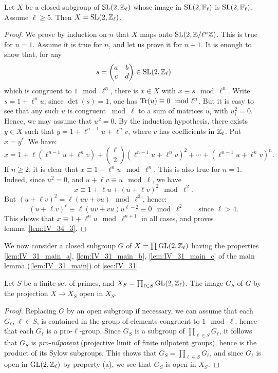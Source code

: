 \begin{lem}\label{lem:IV_34_3}
	Let $X$ be a closed subgroup of $\operatorname{SL}(2, \mathbb{Z}_\ell)$ whose image
	in $\operatorname{SL}(2, \mathbb{F}_\ell)$ is $\operatorname{SL}(2, \mathbb{F}_\ell)$. Assume $\ell \ge 5$. Then $X
	= \operatorname{SL}(2, \mathbb{Z}_\ell)$.
\end{lem}
\begin{proof}
	We prove by induction on $n$ that $X$ maps onto $\operatorname{SL}(2, \mathbb{Z}/\ell^n \mathbb{Z})$.
	This is true for $n = 1$. Assume it is true for $n$, and let us prove it
	for $n+1$. It is enough to show that, for any
	\[
		s = 
		\begin{pmatrix}
			a & b \\
			c & d
		\end{pmatrix}
		\in \operatorname{SL}(2, \mathbb{Z}_\ell)
	\]
	which is congruent to $1 \mod{\ell^n}$, there is $x \in X$ with $x
	\equiv s \mod{\ell^n}$. Write $s = 1 + \ell^nu$; since $\det(s) = 1$,
	one has $\operatorname{Tr}(u) \equiv 0 \mod{\ell^n}$. But it is easy to see that any
	such $u$ is congruent $\bmod{\ell}$ to a sum of matrices $u_i$ with
	$u_i^2 = 0$. Hence, we may assume that $u^2 = 0$. By the induction
	hypothesis, there exists $y \in X$ such that $y = 1 + \ell^{n-1}u +
	\ell^n v$, where $v$ has coefficients in $\mathbb{Z}_\ell$. Put
	\dpage
	$x = y^\ell$. We have:
	\[
		x = 1 + \ell(\ell^{n-1}u + \ell^nv) +
		\binom{\ell}{2}(\ell^{n-1}u + \ell^nv)^2 + \cdots +
		(\ell^{n-1}u + \ell^nv)^n.
	\]
	If $n \ge 2$, it is clear that $x \equiv 1 + \ell^n u \mod{\ell^n}$.
	This is also true for $n = 1$. Indeed, since $u^2 = 0$, and $u + \ell v
	\equiv u \mod\ell$, we have
	\[
		x \equiv 1 + \ell u + (u + \ell v)^2 \mod{\ell^2}.
	\]
	But $(u + \ell v)^2 = \ell(uv + vu) \mod{\ell^2}$, hence:
	\[
		(u + \ell v)^\ell \equiv \ell(uv + vu)u^{\ell-2} \equiv 0
		\mod{\ell^2} \qquad \text{since } \ell > 4.
	\]
	This shows that $x \equiv 1 + \ell^n u \mod{\ell^{n+1}}$ in all cases,
	and proves lemma~\ref{lem:IV_34_3}.
\end{proof}
We now consider a closed subgroup $G$ of $X = \prod \operatorname{GL}(2, \mathbb{Z}_\ell)$ having the
properties \ref{lem:IV_31_main_a}, \ref{lem:IV_31_main_b},
\ref{lem:IV_31_main_c} of the main lemma (\ref{lem:IV_31_main}) of
\ref{sec:IV_31}.

\begin{lem}\label{lem:IV_34_4}
	Let $S$ be a finite set of primes, and $X_S = \prod_{\ell\in S} \operatorname{GL}(2,
	\mathbb{Z}_\ell)$.
	The image $G_S$ of $G$ by the projection $X \to X_S$ open in $X_S$.
\end{lem}
\begin{proof}
	Replacing $G$ by an open subgroup if necessary, we can assume that each
	$G_\ell$, $\ell \in S$, is contained in the group of elements congruent
	to $1 \mod{\ell}$, hence that each $G_\ell$ is a pro-$\ell$-group.
	Since $G_S$ is a subgroup of $\prod_{\ell \in S} G_\ell$, it follows
	that $G_S$ is \emph{pro-nilpotent} (projective limit of finite
	nilpotent groups), hence is the product of its Sylow subgroups. This
	shows that $G_S = \prod_{\ell\in S} G_\ell$, and since $G_\ell$ is
	\dpage
	open in $\operatorname{GL}(2, \mathbb{Z}_\ell)$ by property (a), we see that $G_S$ is open in
	$X_S$.
\end{proof}

